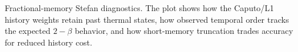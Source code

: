 \caption{Fractional-memory Stefan diagnostics. The plot shows how the Caputo/L1 history weights retain past thermal states, how observed temporal order tracks the expected $2-\beta$ behavior, and how short-memory truncation trades accuracy for reduced history cost.}
\label{fig:direction-c-fractional-memory}
